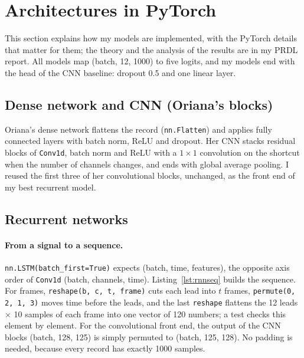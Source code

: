 \section{Architectures in PyTorch}\label{sec:mllb-arch}

This section explains how my models are implemented, with the PyTorch details that matter for them; the
theory and the analysis of the results are in my PRDL report. All models map (batch, 12, 1000) to five
logits, and my models end with the head of the CNN baseline: dropout 0.5 and one linear layer.

\subsection{Dense network and CNN (Oriana's blocks)}

Oriana's dense network flattens the record (\texttt{nn.Flatten}) and applies fully connected layers with
batch norm, ReLU and dropout. Her CNN stacks residual blocks of \texttt{Conv1d}, batch norm and ReLU with a
$1\times1$ convolution on the shortcut when the number of channels changes, and ends with global average
pooling. I reused the first three of her convolutional blocks, unchanged, as the front end of my best
recurrent model.

\subsection{Recurrent networks}

\paragraph{From a signal to a sequence.} \texttt{nn.LSTM(batch\_first=True)} expects (batch, time,
features), the opposite axis order of \texttt{Conv1d} (batch, channels, time). Listing~\ref{lst:rnnseq}
builds the sequence. For frames, \texttt{reshape(b, c, t, frame)} cuts each lead into $t$ frames,
\texttt{permute(0, 2, 1, 3)} moves time before the leads, and the last \texttt{reshape} flattens the 12
leads $\times$ 10 samples of each frame into one vector of 120 numbers; a test checks this element by
element. For the convolutional front end, the output of the CNN blocks (batch, 128, 125) is simply
permuted to (batch, 125, 128). No padding is needed, because every record has exactly 1000 samples.

